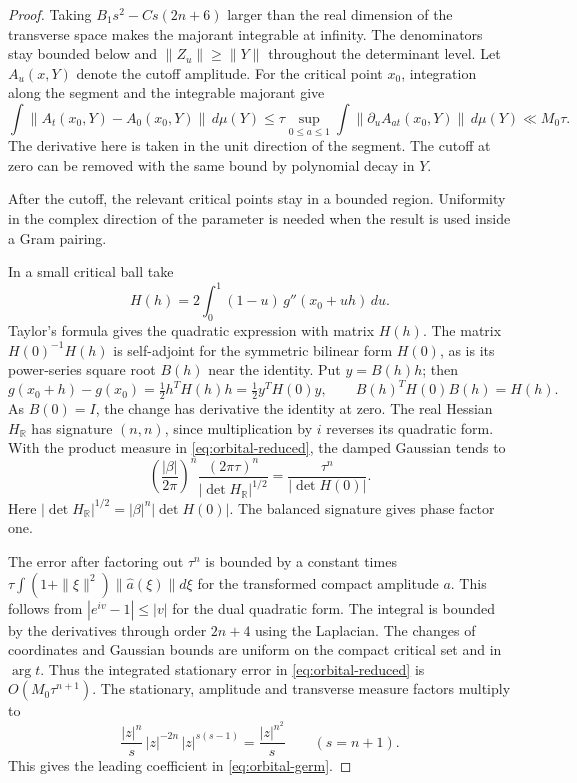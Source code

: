\begin{proof}
Taking \(B_1s^2-Cs(2n+6)\) larger than the real dimension of the transverse space makes the majorant integrable at infinity. The denominators stay bounded below and \(\|Z_u\|\ge\|Y\|\)
throughout the determinant level. Let \(A_u(x,Y)\) denote the
cutoff amplitude. For the critical point \(x_0\), integration along
the segment and the integrable majorant give
\[
 \int \|A_t(x_0,Y)-A_0(x_0,Y)\|\,d\mu(Y)
 \le \tau\sup_{0\le a\le1}\int
        \|\partial_u A_{at}(x_0,Y)\|\,d\mu(Y)
 \ll M_0\tau .
\]
The derivative here is taken in the unit direction of the segment. The cutoff at zero can be removed with
the same bound by polynomial decay in \(Y\).


After the cutoff, the relevant critical points stay in a bounded region. Uniformity in the complex direction of the parameter is needed when the result is used inside a Gram pairing.


In a small critical ball take
\[
 H(h)=2\int_0^1(1-u)\,g''(x_0+uh)\,du .
\]
Taylor's formula gives the quadratic expression with matrix \(H(h)\).
The matrix \(H(0)^{-1}H(h)\) is self-adjoint for the symmetric
bilinear form \(H(0)\), as is its power-series square root \(B(h)\)
near the identity. Put \(y=B(h)h\); then
\[
 g(x_0+h)-g(x_0)=\tfrac12 h^TH(h)h
                =\tfrac12 y^TH(0)y,
 \qquad B(h)^TH(0)B(h)=H(h).
\]
As \(B(0)=I\), the change has derivative the identity at zero. The
real Hessian \(H_{\mathbb R}\) has signature \((n,n)\), since
multiplication by \(i\) reverses its quadratic form. With the product
measure in \eqref{eq:orbital-reduced}, the damped Gaussian tends to
\[
 \left(\frac{|\beta|}{2\pi}\right)^n
       \frac{(2\pi\tau)^n}{|\det H_{\mathbb R}|^{1/2}}
       =\frac{\tau^n}{|\det H(0)|}.
\]
Here \(|\det H_{\mathbb R}|^{1/2}=|\beta|^n|\det H(0)|\).
The balanced signature gives phase factor one.

The error after
factoring out \(\tau^n\) is bounded by a constant times
\(\tau\int(1+\|\xi\|^2)\|\widehat a(\xi)\|d\xi\) for the transformed
compact amplitude \(a\). This follows from \(|e^{iv}-1|\le|v|\)
for the dual quadratic form. The integral is bounded by the
derivatives through order \(2n+4\) using the Laplacian. The
changes of coordinates and Gaussian bounds are uniform on the
compact critical set and in \(\arg t\). Thus the integrated
stationary error in \eqref{eq:orbital-reduced} is \(O(M_0\tau^{n+1})\).
The stationary, amplitude and transverse measure factors
multiply to
\[
 \frac{|z|^n}{s}\,|z|^{-2n}\,|z|^{s(s-1)}
      =\frac{|z|^{n^2}}{s}
 \qquad(s=n+1).
\]
This gives the leading coefficient in \eqref{eq:orbital-germ}.
\end{proof}

